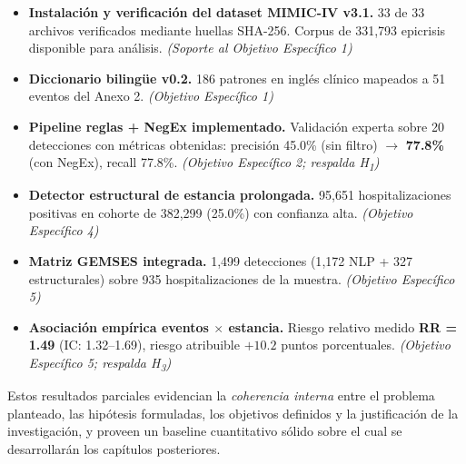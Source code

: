 \begin{itemize}
    \item \textbf{Instalación y verificación del dataset MIMIC-IV v3.1.} 33 de 33 archivos verificados mediante huellas SHA-256. Corpus de 331{,}793 epicrisis disponible para análisis. \emph{(Soporte al Objetivo Específico 1)}
    \item \textbf{Diccionario bilingüe v0.2.} 186 patrones en inglés clínico mapeados a 51 eventos del Anexo 2. \emph{(Objetivo Específico 1)}
    \item \textbf{Pipeline reglas + NegEx implementado.} Validación experta sobre 20 detecciones con métricas obtenidas: precisión 45.0\% (sin filtro) $\rightarrow$ \textbf{77.8\%} (con NegEx), recall 77.8\%. \emph{(Objetivo Específico 2; respalda H\textsubscript{1})}
    \item \textbf{Detector estructural de estancia prolongada.} 95{,}651 hospitalizaciones positivas en cohorte de 382{,}299 (25.0\%) con confianza alta. \emph{(Objetivo Específico 4)}
    \item \textbf{Matriz GEMSES integrada.} 1{,}499 detecciones (1{,}172 NLP + 327 estructurales) sobre 935 hospitalizaciones de la muestra. \emph{(Objetivo Específico 5)}
    \item \textbf{Asociación empírica eventos $\times$ estancia.} Riesgo relativo medido \textbf{RR = 1.49} (IC: 1.32--1.69), riesgo atribuible $+10.2$ puntos porcentuales. \emph{(Objetivo Específico 5; respalda H\textsubscript{3})}
\end{itemize}

Estos resultados parciales evidencian la \emph{coherencia interna} entre el problema planteado, las hipótesis formuladas, los objetivos definidos y la justificación de la investigación, y proveen un baseline cuantitativo sólido sobre el cual se desarrollarán los capítulos posteriores.



